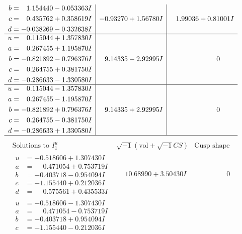 \documentclass[1p]{elsarticle_modified}
\theoremstyle{definition}
\newcommand{\I}{\sqrt{-1}}
\begin{document}
$$\begin{array}{c|c|c}
\begin{aligned}
b &= \phantom{-}1.154440 - 0.053363 I \\
c &= \phantom{-}0.435762 + 0.358619 I \\
d &= -0.038269 - 0.332638 I\end{aligned}
 & -0.93270 + 1.56780 I & \phantom{-}1.99036 + 0.81001 I \\ \hline\begin{aligned}
u &= \phantom{-}0.115044 + 1.357830 I \\
a &= \phantom{-}0.267455 + 1.195870 I \\
b &= -0.821892 - 0.796376 I \\
c &= \phantom{-}0.264755 + 0.381750 I \\
d &= -0.286633 - 1.330580 I\end{aligned}
 & \phantom{-}9.14335 - 2.92995 I & \phantom{-0.000000 } 0 \\ \hline\begin{aligned}
u &= \phantom{-}0.115044 - 1.357830 I \\
a &= \phantom{-}0.267455 - 1.195870 I \\
b &= -0.821892 + 0.796376 I \\
c &= \phantom{-}0.264755 - 0.381750 I \\
d &= -0.286633 + 1.330580 I\end{aligned}
 & \phantom{-}9.14335 + 2.92995 I & \phantom{-0.000000 } 0\\
 \hline 
 \end{array}$$\newpage$$\begin{array}{c|c|c}  
\text{Solutions to }I^u_{1}& \I (\text{vol} + \sqrt{-1}CS) & \text{Cusp shape}\\
 \hline 
\begin{aligned}
u &= -0.518606 + 1.307430 I \\
a &= \phantom{-}0.471054 + 0.753719 I \\
b &= -0.403718 - 0.954094 I \\
c &= -1.155440 + 0.212036 I \\
d &= \phantom{-}0.575561 + 0.435533 I\end{aligned}
 & \phantom{-}10.68990 + 3.50430 I & \phantom{-0.000000 } 0 \\ \hline\begin{aligned}
u &= -0.518606 - 1.307430 I \\
a &= \phantom{-}0.471054 - 0.753719 I \\
b &= -0.403718 + 0.954094 I \\
c &= -1.155440 - 0.212036 I \\

\end{aligned}
\end{array}$$
\end{document}
